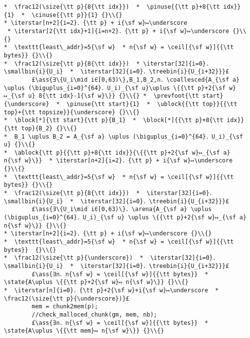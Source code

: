 \documentclass[10pt,twoside]{report}
\makeatletter
\newcommand{\ml}[2][t]{\mbox{\mdseries\begin{tabular}[#1]{@{}L@{}}#2\end{tabular}}}
\newcommand{\ass}[1]{\ensuremath{{\color{blue}\left\{\ml[c]{#1}\right\}}}}
\renewcommand{\ceil}[2][]{\left\lceil{#2}\right\rceil_{#1}}
\newcommand{\iterstar}[2][]{\text{\LARGE $*$}^{#1}_{#2}}
\makeatother
\begin{document}
\begin{lstlisting}
*  \frac12(\size{\tt p}{8{\tt idx}})  *  \pinuse{{\tt p}+8{\tt idx}}{1}  *  \cinuse{{\tt p}}{1} {}\\{}
* \iterstar[n+2]{i=2}．{\tt p} + i{\sf w}↦\underscore  * \iterstar[2{\tt idx}+1]{i=n+2}．{\tt p} + i{\sf w}↦\underscore {}\\{}
*  \texttt{least\_addr}=5{\sf w}  * n{\sf w} = \ceil[{\sf w}]{{\tt bytes}} {}\\{}
*  \frac12(\size{\tt p}{8{\tt idx}})  * \iterstar[32]{i=0}．\smallbin{i}{U_i}  *  \iterstar[32]{i=0}．\treebin{i}{U_{i+32}}}£ 
        £\ass{∃\{U_i\mid i∈[0,63)\},B_1,B_2,n．\coallesced{A_{\sf a} \uplus (\biguplus_{i=0}^{64}．U_i)_{\sf u}\uplus \{{\tt p}+2{\sf w}↦_{\sf u} 8{\tt idx}-1{\sf w}\}} {}\\{} *  \prevfoot{\tt start}{\underscore}  *  \pinuse{\tt start}{1}  *  \ublock{{\tt top}}{{\tt top}+{\tt topsize}}{\underscore} {}\\{}
*  \block[*]{\tt start}{\tt p}{B_1}  *  \block[*]{{\tt p}+8{\tt idx}}{\tt top}{B_2} {}\\{}
*  B_1 \uplus B_2 = A_{\sf a} \uplus (\biguplus_{i=0}^{64}．U_i)_{\sf u} {}\\{}
*  \ablock{\tt p}{{\tt p}+8{\tt idx}}{\{{\tt p}+2{\sf w}↦_{\sf a} n{\sf w}\}}  * \iterstar[n+2]{i=2}．{\tt p} + i{\sf w}↦\underscore {}\\{}
*  \texttt{least\_addr}=5{\sf w}  * n{\sf w} = \ceil[{\sf w}]{{\tt bytes}} {}\\{}
*  \frac12(\size{\tt p}{8{\tt idx}})  *  \iterstar[32]{i=0}．\smallbin{i}{U_i}  *  \iterstar[32]{i=0}．\treebin{i}{U_{i+32}}}£ 
        £\ass{∃\{U_i\mid i∈[0,63)\}．\arena{A_{\sf a} \uplus (\biguplus_{i=0}^{64}．U_i)_{\sf u} \uplus \{{\tt p}+2{\sf w}↦_{\sf a} n{\sf w}\}} {}\\{} 
* \iterstar[n+2]{i=2}．{\tt p} + i{\sf w}↦\underscore {}\\{}
*  \texttt{least\_addr}=5{\sf w}  * n{\sf w} = \ceil[{\sf w}]{{\tt bytes}}  {}\\{}
*  \frac12(\size{\tt p}{\underscore})  *  \iterstar[32]{i=0}．\smallbin{i}{U_i}  *  \iterstar[32]{i=0}．\treebin{i}{U_{i+32}}}£ 
        £\ass{∃n．n{\sf w} = \ceil[{\sf w}]{{\tt bytes}}  *  \state{A\uplus \{{\tt p}+2{\sf w}↦ n{\sf w}\}} {}\\{} 
*  \iterstar[n]{i=0}．{\tt p}+2{\sf w}+i{\sf w}↦\underscore  *  \frac12(\size{\tt p}{\underscore})}£
        mem = chunk2mem(p);
        //check_malloced_chunk(gm, mem, nb);
        £\ass{∃n．n{\sf w} = \ceil[{\sf w}]{{\tt bytes}}  *  \state{A\uplus \{{\tt mem}↦ n{\sf w}\}} {}\\{} 

\end{lstlisting}
\end{document}

